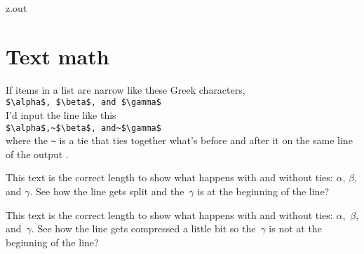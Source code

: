 \MyIO



\begin{VerbatimOut}{z.out}


\section{Text math}

If items in a list are narrow like these Greek characters,\\
     \verb+$\alpha$, $\beta$, and $\gamma$+\\
I'd input the line like this\\
     \verb+$\alpha$,~$\beta$, and~$\gamma$+\\
where the \verb+~+ is a tie
that ties together what's before and after it on the same line of the output
\cite[page~92]{knuth2012}.

This text is the correct length to show what happens with and without ties:
$\alpha$,
$\beta$,
and $\gamma$.
See how the line gets split
and the~$\gamma$ is at the beginning of the line?

This text is the correct length to show what happens with and without ties:
$\alpha$,~$\beta$,
and~$\gamma$.
See how the line gets compressed a little bit so the~$\gamma$
is not at the beginning of the line?
\end{VerbatimOut}

\MyIO
